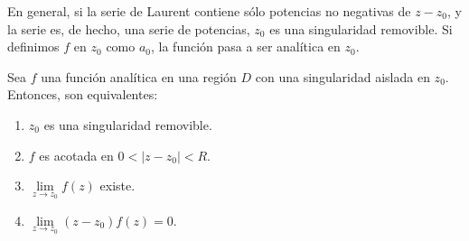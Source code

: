 En general, si la serie de Laurent contiene sólo potencias no negativas de $z-z_0$, y la serie es, de hecho, una serie de potencias, $z_0$ es una singularidad removible. Si definimos $f$ en $z_0$ como $a_0$, la función pasa a ser analítica en $z_0$.

\begin{propo}
Sea $f$ una función analítica en una región $D$ con una singularidad aislada en $z_0$. Entonces, son equivalentes:
\begin{enumerate}
    \item $z_0$ es una singularidad removible.
    
    \item $f$ es acotada en $0 < |z-z_0| < R$.  
    
    \item $\lim\limits_{z\to z_0} f(z)$ existe.
    
    \item $\lim\limits_{z\to z_0} (z-z_0) f(z) = 0$.
\end{enumerate}
\end{propo}

